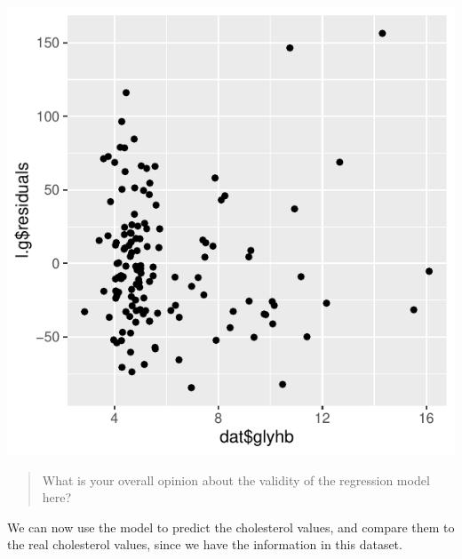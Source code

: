 \documentclass[
]{book}
\newenvironment{Shaded}{\begin{snugshade}}{\end{snugshade}}
\newcommand{\AttributeTok}[1]{\textcolor[rgb]{0.13,0.29,0.53}{#1}}
\newcommand{\DecValTok}[1]{\textcolor[rgb]{0.00,0.00,0.81}{#1}}
\newcommand{\FunctionTok}[1]{\textcolor[rgb]{0.13,0.29,0.53}{\textbf{#1}}}
\newcommand{\NormalTok}[1]{#1}
\newcommand{\SpecialCharTok}[1]{\textcolor[rgb]{0.81,0.36,0.00}{\textbf{#1}}}
\newcommand{\StringTok}[1]{\textcolor[rgb]{0.31,0.60,0.02}{#1}}
\begin{document}
\includegraphics{_main_files/figure-latex/unnamed-chunk-154-3.pdf}

\begin{quote}
What is your overall opinion about the validity of the regression model here?
\end{quote}

We can now use the model to predict the cholesterol values, and compare them to the real cholesterol values, since we have the information in this dataset.

\begin{Shaded}
\end{Shaded}
\end{document}
